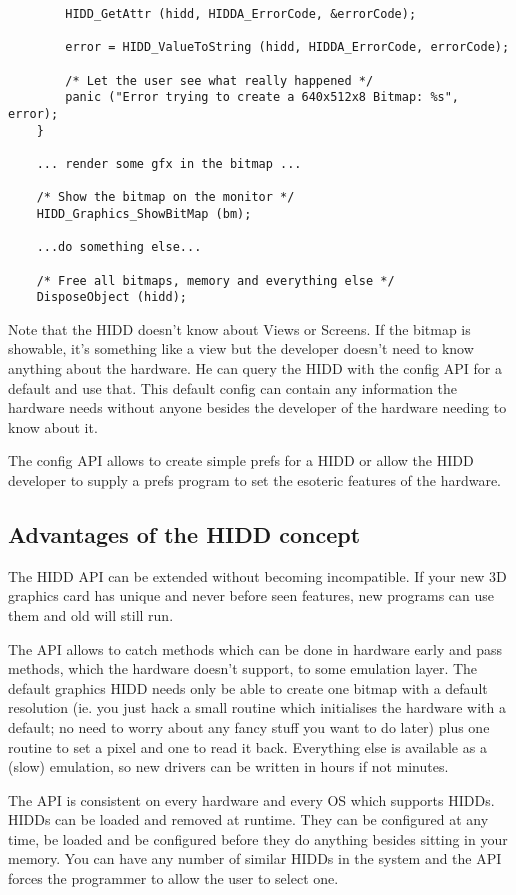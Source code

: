 \begin{verbatim}
	    HIDD_GetAttr (hidd, HIDDA_ErrorCode, &errorCode);

	    error = HIDD_ValueToString (hidd, HIDDA_ErrorCode, errorCode);

	    /* Let the user see what really happened */
	    panic ("Error trying to create a 640x512x8 Bitmap: %s", error);
	}

	... render some gfx in the bitmap ...

	/* Show the bitmap on the monitor */
	HIDD_Graphics_ShowBitMap (bm);

	...do something else...

	/* Free all bitmaps, memory and everything else */
	DisposeObject (hidd);
\end{verbatim}

Note that the HIDD doesn't know about Views or Screens. If the bitmap is
showable, it's something like a view but the developer doesn't need to know
anything about the hardware. He can query the HIDD with the config API for
a default and use that. This default config can contain any information the
hardware needs without anyone besides the developer of the hardware needing
to know about it.

The config API allows to create simple prefs for a HIDD or allow the HIDD
developer to supply a prefs program to set the esoteric features of the
hardware.

\subsection{Advantages of the HIDD concept}

The HIDD API can be extended without becoming incompatible. If your
new 3D graphics card has unique and never before seen features, new
programs can use them and old will still run.

The API allows to catch methods which can be done in hardware early
and pass methods, which the hardware doesn't support, to some
emulation layer. The default graphics HIDD needs only be able
to create one bitmap with a default resolution (ie. you just hack
a small routine which initialises the hardware with a default; no
need to worry about any fancy stuff you want to do later) plus one
routine to set a pixel and one to read it back. Everything else
is available as a (slow) emulation, so new drivers can be written
in hours if not minutes.

The API is consistent on every hardware and every OS which supports
HIDDs. HIDDs can be loaded and removed at runtime. They can be configured
at any time, be loaded and be configured before they do anything
besides sitting in your memory. You can have any number of similar
HIDDs in the system and the API forces the programmer to allow the user
to select one.

